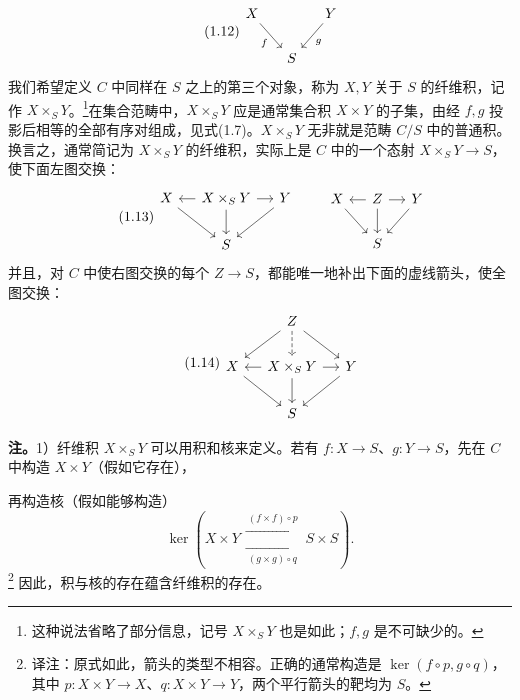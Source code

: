 \begin{equation}\tag{1.12}
\begin{tikzcd}[column sep=small,ampersand replacement=\&]
 X\arrow[dr,"f"'] \&\&Y\arrow[dl,"g"]\\ \&S\&
\end{tikzcd}
\end{equation}
我们希望定义 $C$ 中同样在 $S$ 之上的第三个对象，称为 $X,Y$ 关于 $S$ 的纤维积，记作 $X\times_S Y$。\footnote{这种说法省略了部分信息，记号 $X\times_S Y$ 也是如此；$f,g$ 是不可缺少的。}在集合范畴中，$X\times_S Y$ 应是通常集合积 $X\times Y$ 的子集，由经 $f,g$ 投影后相等的全部有序对组成，见式(1.7)。$X\times_S Y$ 无非就是范畴 $C/S$ 中的普通积。换言之，通常简记为 $X\times_S Y$ 的纤维积，实际上是 $C$ 中的一个态射 $X\times_S Y\to S$，使下面左图交换：
\begin{equation}\tag{1.13}
\begin{tikzcd}[column sep=small,ampersand replacement=\&]
 X\arrow[dr] \& X\times_S Y\arrow[l]\arrow[r]\arrow[d] \&Y\arrow[dl]\\ \&S\&
\end{tikzcd}
\qquad
\begin{tikzcd}[column sep=small,ampersand replacement=\&]
 X\arrow[dr] \&Z\arrow[l]\arrow[r]\arrow[d] \&Y\arrow[dl]\\ \&S\&
\end{tikzcd}
\end{equation}
并且，对 $C$ 中使右图交换的每个 $Z\to S$，都能唯一地补出下面的虚线箭头，使全图交换：
\begin{equation}\tag{1.14}
\begin{tikzcd}[column sep=small,ampersand replacement=\&]
 \& Z\arrow[dl]\arrow[dr]\arrow[d,dashed] \&\\
 X\arrow[dr] \&X\times_S Y\arrow[l]\arrow[r]\arrow[d] \&Y\arrow[dl]\\ \&S\&
\end{tikzcd}
\end{equation}

\textbf{注。}1）纤维积 $X\times_S Y$ 可以用积和核来定义。若有 $f:X\to S$、$g:Y\to S$，先在 $C$ 中构造 $X\times Y$（假如它存在），

再构造核（假如能够构造）
\[
 \ker\left(X\times Y
 \mathrel{\substack{\xrightarrow{\ (f\times f)\circ p\ }\\[-.6ex]\xrightarrow[\ (g\times g)\circ q\ ]{}}}
 S\times S\right).
\]
\footnote{译注：原式如此，箭头的类型不相容。正确的通常构造是 $\ker(f\circ p,g\circ q)$，其中 $p:X\times Y\to X$、$q:X\times Y\to Y$，两个平行箭头的靶均为 $S$。}
因此，积与核的存在蕴含纤维积的存在。

